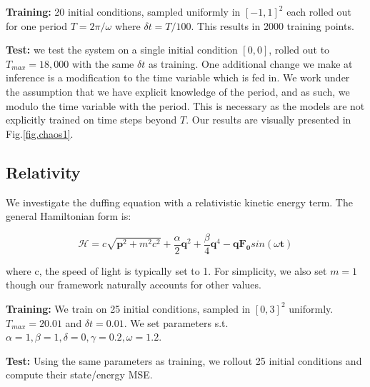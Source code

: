 \documentclass[twoside]{article}
\begin{document}
\textbf{Training:} 20 initial conditions, sampled uniformly in $[-1,1]^2$ each rolled out for one period $T=2\pi/\omega$ where $\delta t = T/100$. This results in 2000 training points.

\textbf{Test:} we test the system on a single initial condition $[0,0]$, rolled out to $T_{max} = 18,000$ with the same $\delta t$ as training. One additional change we make at inference is a modification to the time variable which is fed in. We work under the assumption that we have explicit knowledge of the period, and as such, we modulo the time variable with the period. This is necessary as the models are not explicitly trained on time steps beyond $T$. Our results are visually presented in Fig.\ref{fig.chaos1}.  


\subsection{Relativity}

We investigate the duffing equation with a relativistic kinetic energy term. The general Hamiltonian form is:

\begin{equation}
\mathcal{H} =  c\sqrt{\mathbf{p}^2 +m^2c^2} + \frac{\alpha}{2}\mathbf{q}^2 +\frac{\beta}{4}\mathbf{q}^4 - \mathbf{q}\mathbf{F_0}sin(\omega \mathbf{t})
\end{equation}

where c, the speed of light is typically set to 1. For simplicity, we also set $m=1$ though our framework naturally accounts for other values.

\textbf{Training:} We train on 25 initial conditions, sampled in $[0,3]^2$ uniformly. $T_{max} = 20.01$ and $\delta t = 0.01$. We set parameters s.t. $\alpha =1, \beta =1,\delta =0,\gamma = 0.2,\omega = 1.2$.

\textbf{Test:} Using the same parameters as training, we rollout 25 initial conditions and compute their state/energy MSE.
\end{document}
